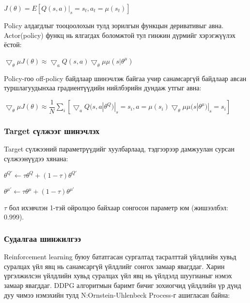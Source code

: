 \documentclass[12pt,A4]{report}
\begin{document}
\begin{center}
$J(\theta) = E[Q(s, a)|_s=s_t,a_t=\mu(s_t)]$
\end{center}

Policy алдагдлыг тооцоолохын тулд зорилгын функцын деривативыг авна. Actor(policy) функц нь ялгагдах боломжтой тул гинжин дүрмийг хэрэгжүүлэх ёстой:

\begin{center}
$\bigtriangledown_\theta\mu J(\theta) \approx \bigtriangledown_a Q(s, a)\bigtriangledown_\theta\mu \mu(s|\theta^\mu)$
\end{center}

Policy-гоо off-policy байдлаар шинэчлэж байгаа учир санамсаргүй байдлаар авсан туршлагуудынхаа градиентүүдийн нийлбэрийн дундаж утгыг авна:

\begin{center}
$\bigtriangledown_\theta\mu J(\theta) \approx \dfrac{1}{N}\sum_{i}[\bigtriangledown_a Q(s, a|\theta^Q)|_s=s_i,a=\mu(s_i)\bigtriangledown_\theta\mu \mu(s|\theta^\mu)|_s=s_i]$
\end{center}

\subsubsection{Target сүлжээг шинэчлэх}
 
Target сүлжээний параметрүүдийг хуулбарлаад, тэдгээрээр дамжуулан сурсан сүлжээнүүдээ хянана:

\begin{center}
$\theta^{Q{'}} \longleftarrow \tau\theta^Q + (1-\tau)\theta^{Q{'}}$ 

$\theta^{\mu{'}} \longleftarrow \tau\theta^\mu + (1-\tau)\theta^{\mu{'}}$ 

$\tau $ бол ихэвчлэн 1-тэй ойролцоо байхаар сонгосон параметр юм (жишээлбэл: 0.999).
\end{center}

\subsubsection{Судалгаа шинжилгээ}

Reinforcement learning буюу бататгасан сургалтад тасралттай үйлдлийн хувьд суралцах үйл явц нь санамсаргүй үйлдлийг сонгох замаар явагддаг. Харин үргэлжилсэн үйлдлийн хувьд суралцах үйл явц нь үйлдэлд шуугианыг нэмэх замаар явагддаг. DDPG алгоритмын баримт бичиг зохиогчид үйлдлийн үр дүнд дуу чимээ нэмэхийн тулд N:Ornstein-Uhlenbeck Process-г ашигласан байна:
\end{document}
